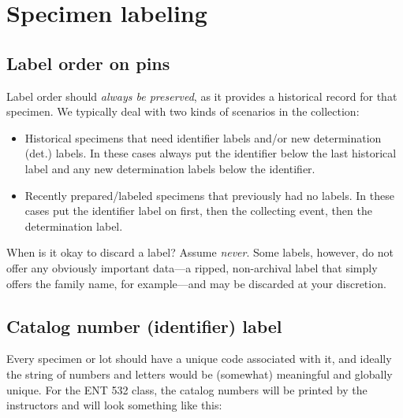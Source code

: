 \section{Specimen labeling}
\subsection{Label order on pins}
Label order should \textit{always be preserved}, as it provides a historical record for that specimen. We typically deal with two kinds of scenarios in the collection:
\begin{itemize}
\item Historical specimens that need identifier labels and/or new determination (det.) labels. In these cases always put the identifier below the last historical label and any new determination labels below the identifier.
\item Recently prepared/labeled specimens that previously had no labels. In these cases put the identifier label on first, then the collecting event, then the determination label.
\end{itemize}
When is it okay to discard a label? Assume \textit{never}. Some labels, however, do not offer any obviously important data---a ripped, non-archival label that simply offers the family name, for example---and may be discarded at your discretion.

\subsection{Catalog number (identifier) label}
Every specimen or lot should have a unique code associated with it, and ideally the string of numbers and letters would be (somewhat) meaningful and globally unique. For the ENT 532 class, the catalog numbers will be printed by the instructors and will look something like this:\\

\hfill\begin{minipage}{\dimexpr\textwidth-1cm}
\begin{labelfontsmall}
\tiny 
{}\vspace{2mm}

\end{labelfontsmall}
\xdef\tpd{\the\prevdepth}
\end{minipage}
\normalsize\vspace{2mm}

